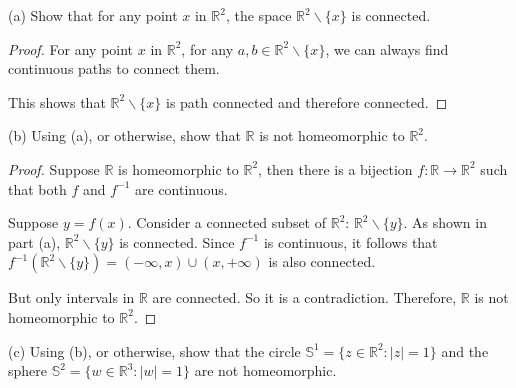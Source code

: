 \documentclass[11pt,a4paper]{amsart}
\def\R{{\mathbb R}}
\def\S{{\mathbb S}}
\def\ra{\rightarrow}
\begin{document}
(a) Show that for any point $x$ in $\R^2$, the space $\R^2\backslash\{x\}$
is connected.

\begin{proof}
For any point $x$ in $\R^2$, for any $a,b \in \R^2\backslash\{x\}$, 
we can always find continuous paths to connect them. 

\begin{figure}[H]
    \centering
\end{figure}

This shows that $\R^2\backslash\{x\}$ is path connected and therefore connected.
\end{proof}

\medskip

(b) Using (a), or otherwise, show that $\R$ is not homeomorphic to $\R^2$.


\begin{proof}
Suppose $\R$ is homeomorphic to $\R^2$, then there is a bijection $f: \R \ra \R^2$
such that both $f$ and $f^{-1}$ are continuous. 

Suppose $y = f(x)$. Consider a connected subset of $\R^2$: $\R^2\backslash\{y\}$. 
As shown in part (a), $\R^2\backslash\{y\}$ is connected. 
Since $f^{-1}$ is continuous, it follows that 
$f^{-1}(\R^2\backslash\{y\}) = (-\infty, x)\cup (x,+\infty)$ is also connected.

But only intervals in $\R$ are connected. So it is a contradiction. 
Therefore, $\R$ is not homeomorphic to $\R^2$.
\end{proof}

\medskip

(c) Using (b), or otherwise, show that the circle $\S^1 = \{z\in\R^2: |z|=1\}$ and the sphere 
$\S^2=\{w\in\R^3:|w|=1\}$ are not homeomorphic. 
\end{document}
